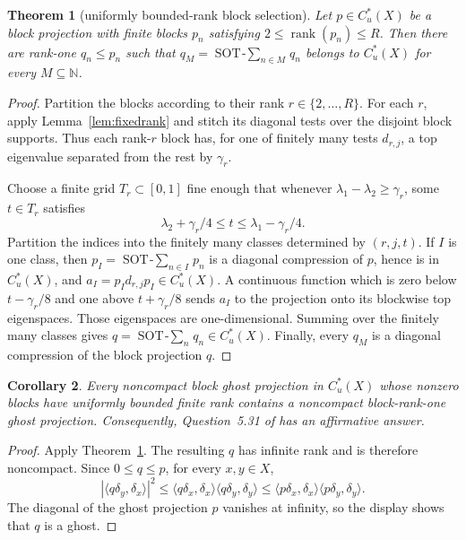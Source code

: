 \documentclass[11pt]{article}
\newtheorem{theorem}{Theorem}
\newtheorem{corollary}[theorem]{Corollary}
\newcommand{\Cu}{C_u^*}
\newcommand{\SOT}{\mathop{\mathrm{SOT}\!-\!\sum}}
\begin{document}
\begin{theorem}[uniformly bounded-rank block selection]\label{thm:boundedblock}
Let $p\in\Cu(X)$ be a block projection with finite blocks $p_n$ satisfying
$2\leq\operatorname{rank}(p_n)\leq R$.  Then there are rank-one
$q_n\leq p_n$ such that $q_M=\SOT_{n\in M}q_n$ belongs to $\Cu(X)$ for
every $M\subseteq\mathbb N$.
\end{theorem}
\begin{proof}
Partition the blocks according to their rank $r\in\{2,\ldots,R\}$.
For each $r$, apply Lemma~\ref{lem:fixedrank} and stitch its diagonal tests
over the disjoint block supports.  Thus each rank-$r$ block has, for one of
finitely many tests $d_{r,j}$, a top eigenvalue separated from the rest by
$\gamma_r$.

Choose a finite grid $T_r\subset[0,1]$ fine enough that whenever
$\lambda_1-\lambda_2\geq\gamma_r$, some $t\in T_r$ satisfies
\[
 \lambda_2+\gamma_r/4\leq t\leq\lambda_1-\gamma_r/4.
\]
Partition the indices into the finitely many classes determined by
$(r,j,t)$.  If $I$ is one class, then
$p_I=\SOT_{n\in I}p_n$ is a diagonal compression of $p$, hence is in
$\Cu(X)$, and $a_I=p_Id_{r,j}p_I\in\Cu(X)$.  A continuous function which is
zero below $t-\gamma_r/8$ and one above $t+\gamma_r/8$ sends $a_I$ to the
projection onto its blockwise top eigenspaces.  Those eigenspaces are
one-dimensional.  Summing over the finitely many classes gives
$q=\SOT_nq_n\in\Cu(X)$.  Finally, every $q_M$ is a diagonal compression of
the block projection $q$.
\end{proof}

\begin{corollary}\label{cor:ghost}
Every noncompact block ghost projection in $\Cu(X)$ whose nonzero blocks
have uniformly bounded finite rank contains a noncompact block-rank-one
ghost projection.  Consequently, Question~5.31 of \cite{Vig} has an
affirmative answer.
\end{corollary}
\begin{proof}
Apply Theorem~\ref{thm:boundedblock}. The resulting $q$ has infinite rank and is
therefore noncompact. Since $0\leq q\leq p$, for every $x,y\in X$,
\[
|\langle q\delta_y,\delta_x\rangle|^2
\leq\langle q\delta_x,\delta_x\rangle\langle q\delta_y,\delta_y\rangle
\leq\langle p\delta_x,\delta_x\rangle\langle p\delta_y,\delta_y\rangle.
\]
The diagonal of the ghost projection $p$ vanishes at infinity, so the
display shows that $q$ is a ghost.
\end{proof}
\end{document}
